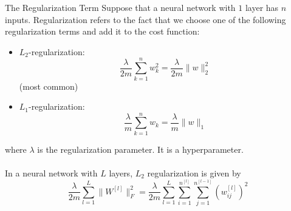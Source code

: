 \documentclass[a4paper]{article}
\begin{document}
\begin{enumerate}
\begin{defn}{The Regularization Term}{} Suppose that a neural network with $1$ layer has $n$ inputs. Regularization refers to the fact that we choose one of the following regularization terms and add it to the cost function: 
\begin{itemize}
\item $L_2$-regularization: $$\frac{\lambda}{2m}\sum_{k=1}^n w_k^2=\frac{\lambda}{2m}\|w\|_2^2$$ (most common)
\item $L_1$-regularization: $$\frac{\lambda}{m}\sum_{k=1}^n w_k=\frac{\lambda}{m}\|w\|_1$$
\end{itemize}
where $\lambda$ is the regularization parameter. It is a hyperparameter. \\~\\
In a neural network with $L$ layers, $L_2$ regularization is given by $$\frac{\lambda}{2m}\sum_{l=1}^L\|W^{[l]}\|_F^2=\frac{\lambda}{2m}\sum_{l=1}^L\sum_{i=1}^{n^{[l]}}\sum_{j=1}^{n^{[l-1]}}(w_{ij}^{[l]})^2$$
\end{defn}


\end{enumerate}
\end{document}
